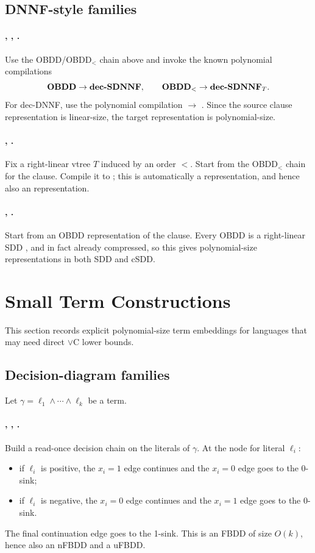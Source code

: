 \documentclass[11pt]{article}
\begin{document}
\subsection{DNNF-style families}
\paragraph{, , .}
Use the OBDD/OBDD$_<$ chain above and invoke the known polynomial compilations
\[
\langref{OBDD} \to \langref{dec\mbox{-}SDNNF},
\qquad
\langfam{OBDD}{<} \to \langfam{dec\mbox{-}SDNNF}{T}.
\]
For dec-DNNF, use the polynomial compilation  $\to$ .
Since the source clause representation is linear-size, the target representation is polynomial-size.

\paragraph{, .}
Fix a right-linear vtree $T$ induced by an order $<$.
Start from the OBDD$_<$ chain for the clause.
Compile it to ; this is automatically a  representation, and hence also an  representation.

\paragraph{, .}
Start from an OBDD representation of the clause.
Every OBDD is a right-linear SDD \citep{Darwiche_2011}, and in fact already compressed, so this gives polynomial-size representations in both SDD and cSDD.

\section{Small Term Constructions}
This section records explicit polynomial-size term embeddings for languages that may need direct $\lor$C lower bounds.

\subsection{Decision-diagram families}
Let $\gamma = \ell_1 \land \cdots \land \ell_k$ be a term.

\paragraph{, , .}
Build a read-once decision chain on the literals of $\gamma$.
At the node for literal $\ell_i$:
\begin{itemize}[noitemsep]
  \item if $\ell_i$ is positive, the $x_i=1$ edge continues and the $x_i=0$ edge goes to the 0-sink;
  \item if $\ell_i$ is negative, the $x_i=0$ edge continues and the $x_i=1$ edge goes to the 0-sink.
\end{itemize}
The final continuation edge goes to the 1-sink.
This is an FBDD of size $O(k)$, hence also an nFBDD and a uFBDD.
\end{document}
